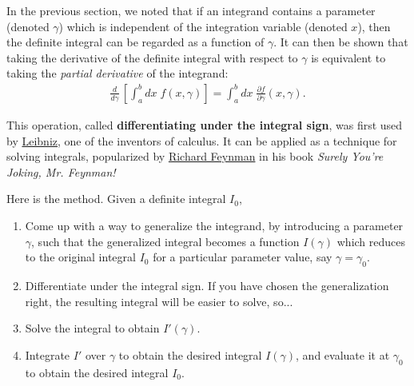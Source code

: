 \documentclass[10pt,a4paper]{article}
\begin{document}
In the previous section, we noted that if an integrand contains a
parameter (denoted $\gamma$) which is independent of the integration
variable (denoted $x$), then the definite integral can be regarded as
a function of $\gamma$.  It can then be shown that taking the
derivative of the definite integral with respect to $\gamma$ is
equivalent to taking the \textit{partial derivative} of the integrand:
\begin{align}
  \frac{d}{d\gamma} \, \left[\int_a^b dx\; f(x,\gamma)\right] = \int_a^b dx \; \frac{\partial f}{\partial \gamma}(x,\gamma).
\end{align}

This operation, called \textbf{differentiating under the integral sign}, was first used by \href{https://en.wikipedia.org/wiki/Gottfried_Wilhelm_Leibniz}{Leibniz}, one of the inventors of calculus.  It can be applied as a technique for solving integrals, popularized by \href{https://en.wikipedia.org/wiki/Richard_Feynman}{Richard Feynman} in his book \textit{Surely You're Joking, Mr. Feynman!}

Here is the method. Given a definite integral $I_0$,

\begin{enumerate}
\item Come up with a way to generalize the integrand, by introducing a parameter $\gamma$, such that the generalized integral becomes a function $I(\gamma)$ which reduces to the original integral $I_0$ for a particular parameter value, say $\gamma = \gamma_0$.

\item Differentiate under the integral sign.  If you have chosen the
  generalization right, the resulting integral will be easier to
  solve, so...

\item Solve the integral to obtain $I'(\gamma)$.

\item Integrate $I'$ over $\gamma$ to obtain the desired integral
  $I(\gamma)$, and evaluate it at $\gamma_0$ to obtain the desired
  integral $I_0$.
\end{enumerate}
\end{document}

